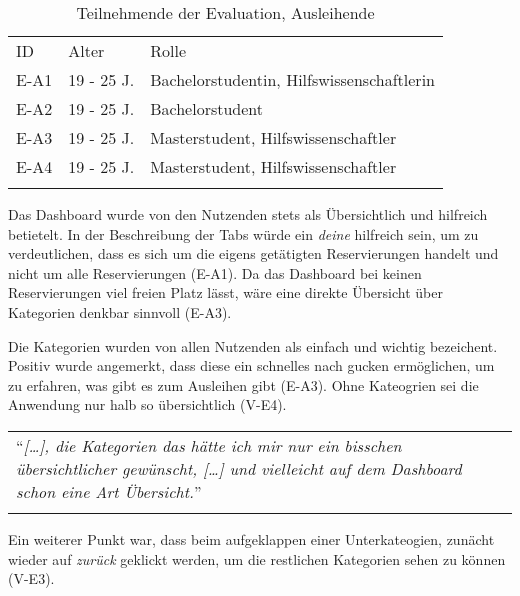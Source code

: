 \begin{table}[h]
  \centering
  \caption{Teilnehmende der Evaluation, Ausleihende}
  \begin{tabular}{lll}
    \arrayrulecolor{maincolor}\hline
    \sffamily\color{maincolor}ID & \sffamily\color{maincolor}Alter &
    \sffamily\color{maincolor}Rolle
    \\
    \arrayrulecolor{maincolor}\hline
    E-A1                         & 19 - 25 J.                      &
    Bachelorstudentin, Hilfswissenschaftlerin
    \\
    E-A2                         & 19 - 25 J.                      &
    Bachelorstudent                                                  \\
    E-A3                         & 19 - 25 J.                      &
    Masterstudent, Hilfswissenschaftler
    \\
    E-A4                         & 19 - 25 J.                      &
    Masterstudent, Hilfswissenschaftler
    \\
    \arrayrulecolor{maincolor}\hline
  \end{tabular}
  \label{table:azwei}
\end{table}

Das Dashboard wurde von den Nutzenden stets als Übersichtlich und hilfreich betietelt. In der
Beschreibung der Tabs würde ein \textit{deine} hilfreich sein, um zu verdeutlichen, dass es sich um
die eigens getätigten Reservierungen handelt und nicht um alle Reservierungen (E-A1). Da das
Dashboard bei keinen Reservierungen viel freien Platz lässt, wäre eine direkte Übersicht über
Kategorien denkbar sinnvoll (E-A3). 

Die Kategorien wurden von allen Nutzenden als einfach und wichtig bezeichent. Positiv wurde angemerkt, dass
diese ein schnelles nach gucken ermöglichen, um zu erfahren, was gibt es zum Ausleihen gibt (E-A3). Ohne
Kateogrien sei die Anwendung nur halb so übersichtlich (V-E4).

\begin{longtable}{p{}} 
  \arrayrulecolor{maincolor}\hline
  \enquote{\textit{[\dots], die Kategorien das hätte ich mir nur ein bisschen übersichtlicher gewünscht,
  [\dots] und vielleicht auf dem Dashboard schon eine Art Übersicht.}} \\
  \arrayrulecolor{maincolor}\hline
\end{longtable}

Ein weiterer Punkt war, dass beim aufgeklappen einer Unterkateogien, zunächt wieder auf
\textit{zurück} geklickt werden, um die restlichen Kategorien sehen zu können (V-E3). 

